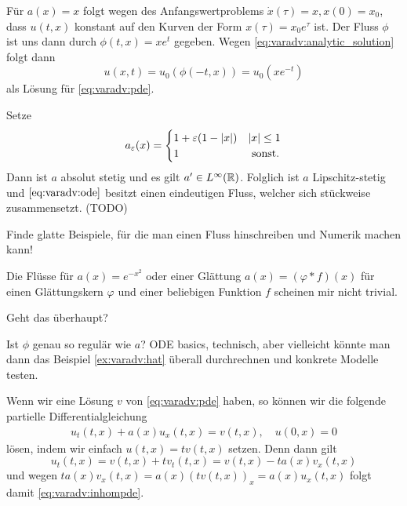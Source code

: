 \begin{example}
Für $a(x) = x$ folgt wegen des Anfangswertproblems $\dot x(\tau) = x, x(0) = x_0$, dass $u(t,x)$ konstant auf den Kurven der Form $x(\tau) = x_0 e^{\tau}$ ist.
Der Fluss $\phi$ ist uns dann durch $\phi(t,x) = x e^t$ gegeben. Wegen \eqref{eq:varadv:analytic_solution} folgt dann \[ u(x,t) = u_0(\phi(-t,x)) = u_0(x e^{-t}) \] als Lösung für \eqref{eq:varadv:pde}.
\end{example}
\begin{example} \label{ex:varadv:hat}
Setze
\[
a_\varepsilon(x) = \begin{cases} 
    1 + \varepsilon (1 - \left| x \right|) & \left| x \right| \leq 1\\
    1 & \text{ sonst.}
\end{cases}
\]
Dann ist $a$ absolut stetig und es gilt $a' \in L^\infty(\mathbb R)$.
Folglich ist $a$ Lipschitz-stetig und $\eqref{eq:varadv:ode}$ besitzt einen eindeutigen Fluss, welcher sich stückweise zusammensetzt. (TODO)
\end{example}

\begin{remark}Finde glatte Beispiele, für die man einen Fluss hinschreiben und Numerik machen kann!\end{remark}

\begin{remark}Die Flüsse für $a(x) = e^{-x^2}$ oder einer Glättung $a(x) = (\varphi * f)(x)$ für einen Glättungskern $\varphi$ und einer beliebigen Funktion $f$ scheinen mir nicht trivial.\end{remark}

\begin{frage}Geht das überhaupt?\end{frage}

\begin{frage}Ist $\phi$ genau so regulär wie $a$? ODE basics, technisch, aber vielleicht könnte man dann das Beispiel \ref{ex:varadv:hat} überall durchrechnen und konkrete Modelle testen.\end{frage}

Wenn wir eine Lösung $v$ von \eqref{eq:varadv:pde} haben, so können wir die folgende partielle Differentialgleichung
\begin{align}\label{eq:varadv:inhompde}
u_t(t,x) + a(x) u_x(t,x) = v(t,x), \quad u(0,x) = 0
\end{align}
lösen, indem wir einfach $u(t,x) = t v(t,x)$ setzen. Denn dann gilt
\[ u_t(t,x) = v(t,x) + t v_t(t,x) = v(t,x) - t a(x) v_x(t,x) \]
und wegen $t a(x) v_x(t,x) = a(x) (t v(t,x))_x = a(x) u_x(t,x)$ folgt damit \eqref{eq:varadv:inhompde}.

